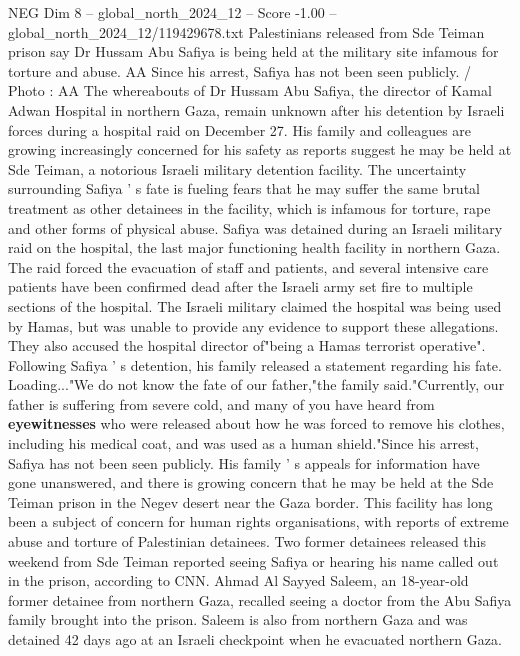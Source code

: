 \begin{textsample}{NEG Dim 8 – global\_north\_2024\_12 – Score -1.00 – global\_north\_2024\_12/119429678.txt}  \label{ex:f8_neg_119}
Palestinians released from Sde Teiman prison say Dr Hussam Abu Safiya is being held at the military site infamous for torture and abuse.
AA Since his arrest, Safiya has not been seen publicly. / Photo : AA The whereabouts of Dr Hussam Abu Safiya, the director of Kamal Adwan Hospital in northern Gaza, remain unknown after his detention by Israeli forces during a hospital raid on December 27.
His family and colleagues are growing increasingly concerned for his safety as reports suggest he may be held at Sde Teiman, a notorious Israeli military detention facility.
The uncertainty surrounding Safiya ' s fate is fueling fears that he may suffer the same brutal treatment as other detainees in the facility, which is infamous for torture, rape and other forms of physical abuse.
Safiya was detained during an Israeli military raid on the hospital, the last major functioning health facility in northern Gaza.
The raid forced the evacuation of staff and patients, and several intensive care patients have been confirmed dead after the Israeli army set fire to multiple sections of the hospital.
The Israeli military claimed the hospital was being used by Hamas, but was unable to provide any evidence to support these allegations.
They also accused the hospital director of"being a Hamas terrorist operative".
Following Safiya ' s detention, his family released a statement regarding his fate.
Loading..."We do not know the fate of our father,"the family said."Currently, our father is suffering from severe cold, and many of you have heard from \textbf{eyewitnesses} who were released about how he was forced to remove his clothes, including his medical coat, and was used as a human shield."Since his arrest, Safiya has not been seen publicly.
His family ' s appeals for information have gone unanswered, and there is growing concern that he may be held at the Sde Teiman prison in the Negev desert near the Gaza border.
This facility has long been a subject of concern for human rights organisations, with reports of extreme abuse and torture of Palestinian detainees.
Two former detainees released this weekend from Sde Teiman reported seeing Safiya or hearing his name called out in the prison, according to CNN.
Ahmad Al Sayyed Saleem, an 18-year-old former detainee from northern Gaza, recalled seeing a doctor from the Abu Safiya family brought into the prison.
Saleem is also from northern Gaza and was detained 42 days ago at an Israeli checkpoint when he evacuated northern Gaza.

\end{textsample}
